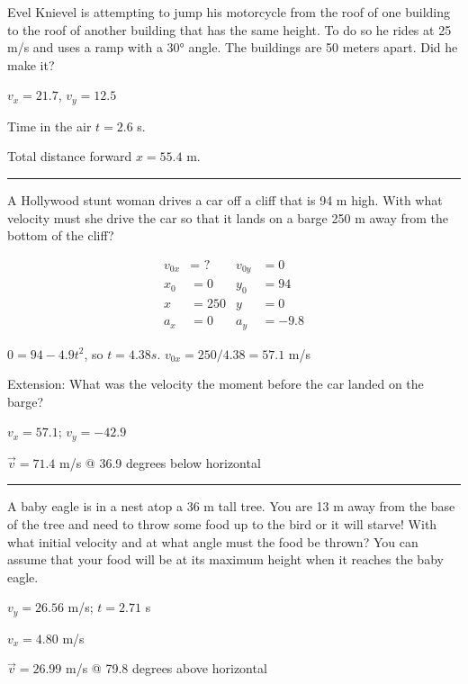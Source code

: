 \documentclass[12pt]{exam}
\begin{document}
\def\mystrut{\protect\rule[-2.2ex]{0ex}{2.2ex}} 
\qformat{ \textbf{Task \#\thequestion}
  \ifthenelse{\equal{\thequestion}{\thequestiontitle}}
    {}
    {: \emph{\thequestiontitle}}
  \mystrut  \hfill}
\begin{questions}

\Large

\question
  Evel Knievel is attempting to jump his motorcycle from the roof of one building to the roof of another building that has the same height.  To do so he rides at 25 m/s and uses a ramp with a 30° angle.  The buildings are 50 meters apart.  Did he make it?

  \begin{solution}
    $v_x=21.7$, $v_y=12.5$
    
    Time in the air $t=2.6$ s.

    Total distance forward $x=55.4$ m.
  \end{solution}
  

\vs \hrule \vs

\question

  A Hollywood stunt woman drives a car off a cliff that is 94 m high.  With what velocity must she drive the car so that it lands on a barge 250 m away from the bottom of the cliff?

  \begin{solution}
    \begin{align*}
      v_{0x} &= \text{ ?} &   v_{0y} &= 0\\
      x_0 &= 0            &   y_0 &= 94\\
      x &= 250            &   y &= 0\\
      a_x &= 0            &   a_y &= -9.8
    \end{align*}

    $0=94-4.9t^2$, so $t = 4.38 s$.  $v_{0x}=250/4.38=57.1$ m/s

    Extension: What was the velocity the moment before the car landed on the barge?

    $v_x= 57.1$; $v_y= -42.9$
    
    $\vec{v} = 71.4$ m/s @ 36.9 degrees below horizontal


  \end{solution}





  \vs \hrule \vs

\question
  A baby eagle is in a nest atop a 36 m tall tree.  You are 13 m away from the base of the tree and need to throw some food up to the bird or it will starve!  With what initial velocity and at what angle must the food be thrown?  You can assume that your food will be at its maximum height when it reaches the baby eagle.

  \begin{solution}
    $v_y=26.56$ m/s; $t=2.71$ s

    $v_x=4.80$ m/s

    $\vec{v}=26.99$ m/s @ 79.8 degrees above horizontal
  \end{solution}

\end{questions}
\end{document}
